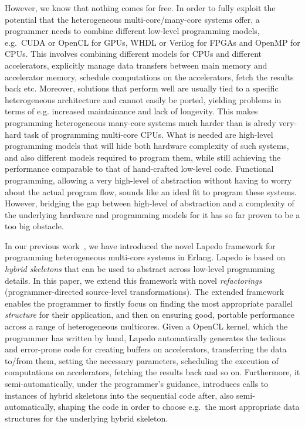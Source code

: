 \documentclass[final]{jfp1}
\newcommand{\lapedo}{\xspace{\sc Lapedo}\xspace}
\newcommand{\Lapedo}{\lapedo}
\begin{document}
However, we know that nothing comes for free. In order to fully exploit
the potential that the heterogeneous multi-core/many-core systems offer, a programmer needs
to combine different low-level programming models, e.g.~CUDA or OpenCL for GPUs,
WHDL or Verilog for FPGAs and OpenMP for CPUs. This involves
combining different models for CPUs and different 
accelerators, explicitly manage data transfers between main memory and
accelerator memory, schedule computations on the accelerators, fetch the 
results back etc. 
Moreover, solutions
that perform well are usually tied to a specific heterogeneous architecture
and cannot easily be ported, yielding problems in terms of e.g. increased maintainance and lack of longevity.
This makes programming heterogeneous many-core systems much
harder than is alredy very-hard task of programming multi-core CPUs. What is
needed are high-level programming models that will hide both hardware 
complexity of such systems, and also different models required to program them,
while still achieving the performance comparable to that of hand-crafted
low-level code. Functional programming, allowing a very high-level of 
abstraction without having to worry about the actual program flow, sounds
like an ideal fit to program these systems. However, bridging the gap between
high-level of abstraction and a complexity of the underlying hardware and
programming models for it has so far proven to be a too big obstacle.

In our previous work~\cite{parco2015}, we have introduced the novel \Lapedo{} framework for programming heterogeneous multi-core systems in Erlang. \Lapedo{} is based on \emph{hybrid skeletons} that can be used to abstract across low-level programming details. In this paper, we extend this framework with novel \emph{refactorings} (programmer-directed source-level transformations). The extended framework enables the  programmer to firstly focus on finding  the most appropriate parallel \emph{structure} for their application, and then on ensuring good, portable performance across a range of heterogeneous multicores. Given a OpenCL kernel, which the programmer has written by hand, \Lapedo{} automatically generates the tedious and error-prone code for creating buffers on accelerators, transferring the data to/from them, setting the  necessary parameters, scheduling the execution of computations on accelerators, fetching the results back and so on. Furthermore, it semi-automatically, under the programmer's guidance, introduces calls to instances of hybrid skeletons into the sequential code after, also semi-automatically, shaping the code in order to choose e.g.~the most appropriate data structures for the underlying hybrid skeleton.
\end{document}
